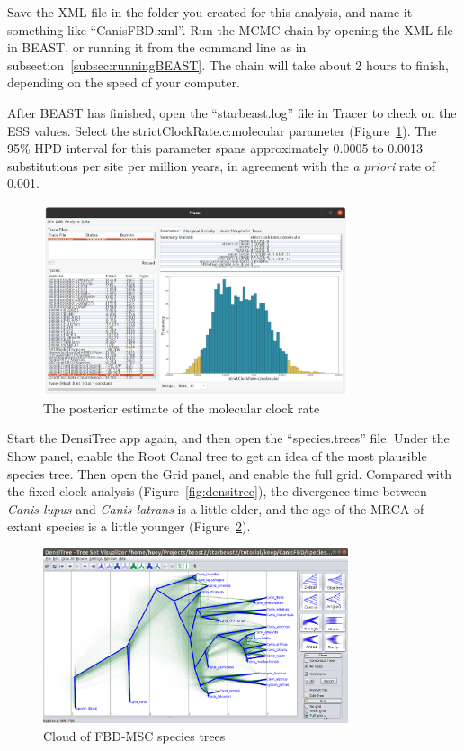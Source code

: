 \documentclass[12pt]{article}
\begin{document}
Save the XML file in the folder you created for this analysis, and name it
something like ``CanisFBD.xml''. Run the MCMC chain by opening the XML file in
BEAST, or running it from the command line as in
subsection~\ref{subsec:runningBEAST}. The chain will take about 2 hours to
finish, depending on the speed of your computer.

After BEAST has finished, open the ``starbeast.log'' file in Tracer to check
on the ESS values. Select the strictClockRate.c:molecular parameter
(Figure~\ref{fig:strictClockRate}). The 95\% HPD interval for this parameter
spans approximately 0.0005 to 0.0013 substitutions per site per million years,
in agreement with the \textit{a priori} rate of 0.001.

\begin{figure}[htb!]
\centering
\includegraphics[width=0.8\textwidth]{figures/strictClockRate.png}
\caption
{The posterior estimate of the molecular clock rate}
\label{fig:strictClockRate}
\end{figure}

Start the DensiTree app again, and then open the ``species.trees'' file. Under
the Show panel, enable the Root Canal tree to get an idea of the most
plausible species tree. Then open the Grid panel, and enable the full grid.
Compared with the fixed clock analysis (Figure~\ref{fig:densitree}), the
divergence time between \textit{Canis lupus} and \textit{Canis latrans} is a
little older, and the age of the MRCA of extant species is a little younger
(Figure~\ref{fig:densitreeSA}).

\begin{figure}[htb!]
\centering
\includegraphics[width=0.8\textwidth]{figures/densitreeSA.png}
\caption
{Cloud of FBD-MSC species trees}
\label{fig:densitreeSA}
\end{figure}
\end{document}
